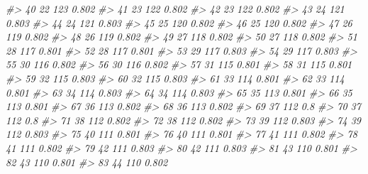 \documentclass[
]{book}
\newenvironment{Shaded}{\begin{snugshade}}{\end{snugshade}}
\newcommand{\CommentTok}[1]{\textcolor[rgb]{0.56,0.35,0.01}{\textit{#1}}}
\begin{document}
\begin{Shaded}
\begin{Highlighting}[]
\CommentTok{\#\textgreater{} 40          22      123 0.802}
\CommentTok{\#\textgreater{} 41          23      122 0.802}
\CommentTok{\#\textgreater{} 42          23      122 0.802}
\CommentTok{\#\textgreater{} 43          24      121 0.803}
\CommentTok{\#\textgreater{} 44          24      121 0.803}
\CommentTok{\#\textgreater{} 45          25      120 0.802}
\CommentTok{\#\textgreater{} 46          25      120 0.802}
\CommentTok{\#\textgreater{} 47          26      119 0.802}
\CommentTok{\#\textgreater{} 48          26      119 0.802}
\CommentTok{\#\textgreater{} 49          27      118 0.802}
\CommentTok{\#\textgreater{} 50          27      118 0.802}
\CommentTok{\#\textgreater{} 51          28      117 0.801}
\CommentTok{\#\textgreater{} 52          28      117 0.801}
\CommentTok{\#\textgreater{} 53          29      117 0.803}
\CommentTok{\#\textgreater{} 54          29      117 0.803}
\CommentTok{\#\textgreater{} 55          30      116 0.802}
\CommentTok{\#\textgreater{} 56          30      116 0.802}
\CommentTok{\#\textgreater{} 57          31      115 0.801}
\CommentTok{\#\textgreater{} 58          31      115 0.801}
\CommentTok{\#\textgreater{} 59          32      115 0.803}
\CommentTok{\#\textgreater{} 60          32      115 0.803}
\CommentTok{\#\textgreater{} 61          33      114 0.801}
\CommentTok{\#\textgreater{} 62          33      114 0.801}
\CommentTok{\#\textgreater{} 63          34      114 0.803}
\CommentTok{\#\textgreater{} 64          34      114 0.803}
\CommentTok{\#\textgreater{} 65          35      113 0.801}
\CommentTok{\#\textgreater{} 66          35      113 0.801}
\CommentTok{\#\textgreater{} 67          36      113 0.802}
\CommentTok{\#\textgreater{} 68          36      113 0.802}
\CommentTok{\#\textgreater{} 69          37      112   0.8}
\CommentTok{\#\textgreater{} 70          37      112   0.8}
\CommentTok{\#\textgreater{} 71          38      112 0.802}
\CommentTok{\#\textgreater{} 72          38      112 0.802}
\CommentTok{\#\textgreater{} 73          39      112 0.803}
\CommentTok{\#\textgreater{} 74          39      112 0.803}
\CommentTok{\#\textgreater{} 75          40      111 0.801}
\CommentTok{\#\textgreater{} 76          40      111 0.801}
\CommentTok{\#\textgreater{} 77          41      111 0.802}
\CommentTok{\#\textgreater{} 78          41      111 0.802}
\CommentTok{\#\textgreater{} 79          42      111 0.803}
\CommentTok{\#\textgreater{} 80          42      111 0.803}
\CommentTok{\#\textgreater{} 81          43      110 0.801}
\CommentTok{\#\textgreater{} 82          43      110 0.801}
\CommentTok{\#\textgreater{} 83          44      110 0.802}

\end{Highlighting}
\end{Shaded}
\end{document}
